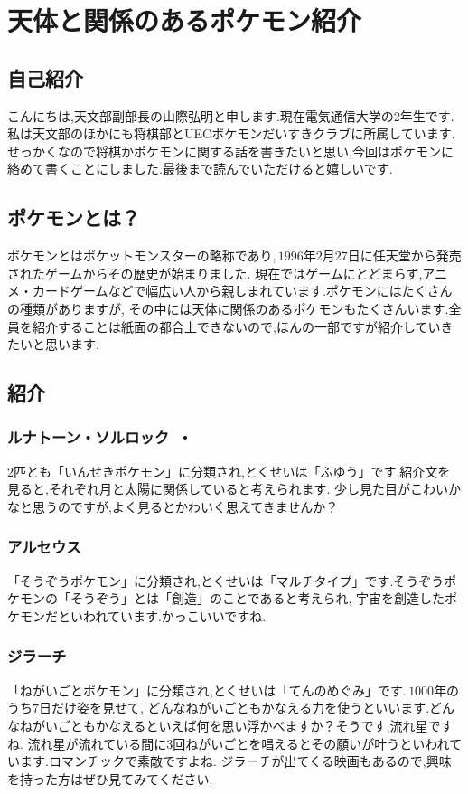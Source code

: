 \documentclass[../../super_nova_2023]{subfiles}
\begin{document}
\chapter{天体と関係のあるポケモン紹介}

\section{自己紹介~}
こんにちは,天文部副部長の山際弘明と申します.現在電気通信大学の$2$年生です.私は天文部のほかにも将棋部とUECポケモンだいすきクラブに所属しています.
せっかくなので将棋かポケモンに関する話を書きたいと思い,今回はポケモンに絡めて書くことにしました.最後まで読んでいただけると嬉しいです.
\section{ポケモンとは？}
ポケモンとはポケットモンスターの略称であり,\,$1996$年$2$月$27$日に任天堂から発売されたゲームからその歴史が始まりました.
現在ではゲームにとどまらず,アニメ・カードゲームなどで幅広い人から親しまれています.ポケモンにはたくさんの種類がありますが,
その中には天体に関係のあるポケモンもたくさんいます.全員を紹介することは紙面の都合上できないので,ほんの一部ですが紹介していきたいと思います.
\section{紹介}
\subsection{ルナトーン・ソルロック~・}
$2$匹とも「いんせきポケモン」に分類され,とくせいは「ふゆう」です.紹介文を見ると,それぞれ月と太陽に関係していると考えられます.
少し見た目がこわいかなと思うのですが,よく見るとかわいく思えてきませんか？
\subsection{アルセウス~}
「そうぞうポケモン」に分類され,とくせいは「マルチタイプ」です.そうぞうポケモンの「そうぞう」とは「創造」のことであると考えられ,
宇宙を創造したポケモンだといわれています.かっこいいですね.
\subsection{ジラーチ~}
「ねがいごとポケモン」に分類され,とくせいは「てんのめぐみ」です.\,$1000$年のうち$7$日だけ姿を見せて,
どんなねがいごともかなえる力を使うといいます.どんなねがいごともかなえるといえば何を思い浮かべますか？そうです,流れ星ですね.
流れ星が流れている間に$3$回ねがいごとを唱えるとその願いが叶うといわれています.ロマンチックで素敵ですよね.
ジラーチが出てくる映画もあるので,興味を持った方はぜひ見てみてください.
\end{document}
